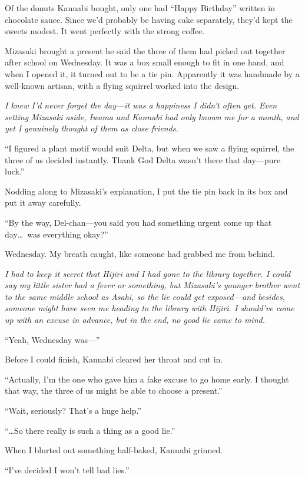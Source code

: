 \documentclass[
    a4paper,
    12pt,
    twoside,
    openany,
    UTF8,
    fontset=windows
]{ctexbook}
\begin{document}
Of the donuts Kannabi bought, only one had ``Happy Birthday'' written in chocolate sauce. Since we'd probably be having cake separately, they'd kept the sweets modest. It went perfectly with the strong coffee.

Mizasaki brought a present he said the three of them had picked out together after school on Wednesday. It was a box small enough to fit in one hand, and when I opened it, it turned out to be a tie pin. Apparently it was handmade by a well-known artisan, with a flying squirrel worked into the design.

\textit{I knew I'd never forget the day---it was a happiness I didn't often get. Even setting Mizasaki aside, Iwama and Kannabi had only known me for a month, and yet I genuinely thought of them as close friends.}

``I figured a plant motif would suit Delta, but when we saw a flying squirrel, the three of us decided instantly. Thank God Delta wasn't there that day---pure luck.''

Nodding along to Mizasaki's explanation, I put the tie pin back in its box and put it away carefully.

``By the way, Del-chan---you said you had something urgent come up that day\dots\ was everything okay?''

Wednesday. My breath caught, like someone had grabbed me from behind.

\textit{I had to keep it secret that Hijiri and I had gone to the library together. I could say my little sister had a fever or something, but Mizasaki's younger brother went to the same middle school as Asahi, so the lie could get exposed---and besides, someone might have seen me heading to the library with Hijiri. I should've come up with an excuse in advance, but in the end, no good lie came to mind.}

``Yeah, Wednesday was---''

Before I could finish, Kannabi cleared her throat and cut in.

``Actually, I'm the one who gave him a fake excuse to go home early. I thought that way, the three of us might be able to choose a present.''

``Wait, seriously? That's a huge help.''

``\dots So there really is such a thing as a good lie.''

When I blurted out something half-baked, Kannabi grinned.

``I've decided I won't tell bad lies.''
\end{document}
